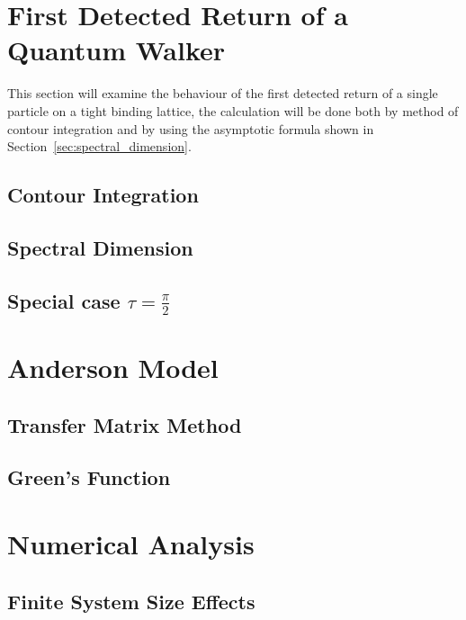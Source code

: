 \documentclass[12pt]{article}
\numberwithin{equation}{section}
\newcommand{\1}{\mathbb{1}}
\begin{document}
\section{First Detected Return of a Quantum Walker}
This section will examine the behaviour of the first detected return of a single particle on a tight binding lattice, the calculation will be done both by method of contour integration and by using the asymptotic formula shown in Section~\ref{sec:spectral_dimension}.
\subsection{Contour Integration}
\subsection{Spectral Dimension}
\subsection{Special case $\tau=\frac{\pi}{2}$}
\section{Anderson Model}
\subsection{Transfer Matrix Method}
\subsection{Green's Function}
\section{Numerical Analysis}
\subsection{Finite System Size Effects}
\section{}
\end{document}
